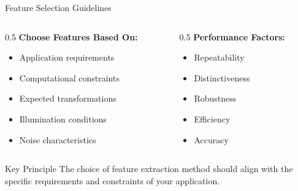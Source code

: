\documentclass[aspectratio=169,10pt]{beamer}
\begin{document}
\begin{frame}{Feature Selection Guidelines}
    \begin{columns}[c]
        \begin{column}{0.5\textwidth}
            \textbf{Choose Features Based On:}
            \begin{itemize}
                \item Application requirements
                \item Computational constraints
                \item Expected transformations
                \item Illumination conditions
                \item Noise characteristics
            \end{itemize}
        \end{column}
        \begin{column}{0.5\textwidth}
            \textbf{Performance Factors:}
            \begin{itemize}
                \item Repeatability
                \item Distinctiveness
                \item Robustness
                \item Efficiency
                \item Accuracy
            \end{itemize}
        \end{column}
    \end{columns}

    \begin{alertblock}{Key Principle}
        The choice of feature extraction method should align with the specific requirements and constraints of your application.
    \end{alertblock}
\end{frame}
\end{document}
